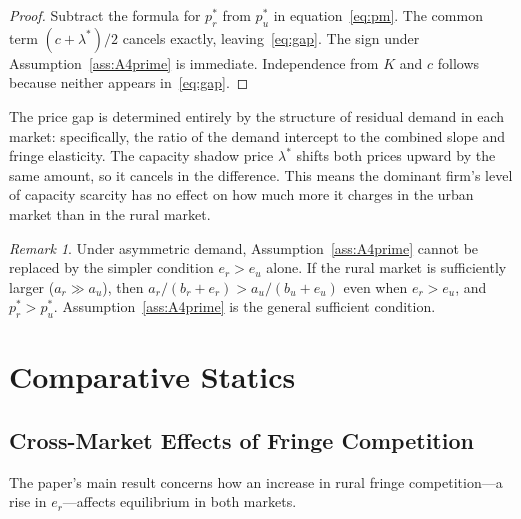 \documentclass[12pt]{article}
\theoremstyle{plain}
\theoremstyle{definition}
\theoremstyle{remark}
\newtheorem{remark}{Remark}
\begin{document}
\begin{proof}
Subtract the formula for $p_r^*$ from $p_u^*$ in equation~\eqref{eq:pm}.
The common term $(c + \lambda^*)/2$ cancels exactly, leaving~\eqref{eq:gap}.
The sign under Assumption~\ref{ass:A4prime} is immediate.  Independence from
$K$ and $c$ follows because neither appears in~\eqref{eq:gap}.
\end{proof}

The price gap is determined entirely by the structure of residual demand in
each market: specifically, the ratio of the demand intercept to the combined
slope and fringe elasticity.  The capacity shadow price $\lambda^*$ shifts
both prices upward by the same amount, so it cancels in the difference.
This means the dominant firm's level of capacity scarcity has no effect on
how much more it charges in the urban market than in the rural market.

\begin{remark}
\label{rem:gap-asymmetry}
Under asymmetric demand, Assumption~\ref{ass:A4prime} cannot be replaced by
the simpler condition $e_r > e_u$ alone.  If the rural market is sufficiently
larger ($a_r \gg a_u$), then $a_r/(b_r + e_r) > a_u/(b_u + e_u)$ even when
$e_r > e_u$, and $p_r^* > p_u^*$.  Assumption~\ref{ass:A4prime} is the general
sufficient condition.
\end{remark}

\section{Comparative Statics}
\label{sec:comparative}

\subsection{Cross-Market Effects of Fringe Competition}

The paper's main result concerns how an increase in rural fringe competition---a
rise in $e_r$---affects equilibrium in both markets.
\end{document}
